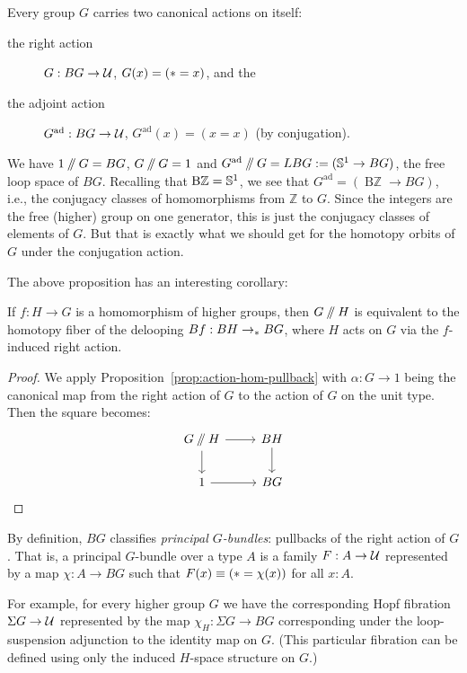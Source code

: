 Every group $G$ carries two canonical actions on itself:
\begin{description}
\item[the right action] $G : BG \to \mathcal{U}$, $G(x) = (\ast = x)$, and the
\item[the adjoint action] $G^{\mathrm{ad}} : BG \to \mathcal{U}$,
  $G^{\mathrm{ad}}(x) = (x = x)$ (by conjugation).
\end{description}

We have $1 \mathbin{/\kern-3pt/} G = BG$,
$G \mathbin{/\kern-3pt/} G = 1$ and $G^{\mathrm{ad}} \mathbin{/\kern-3pt/} G = LBG :=
({\mathbb{S}}^1 \to BG)$, the free loop space of $BG$. Recalling that $\mathop{\mathrm{B}\mathbb{Z}} =
{\mathbb{S}}^1$, we see that $G^{\mathrm{ad}} = (\mathop{\mathrm{B}\mathbb{Z}} \to BG)$, i.e., the
conjugacy classes of homomorphisms from $\mathbb{Z}$ to $G$. Since the
integers are the free (higher) group on one generator, this is just
the conjugacy classes of elements of $G$. But that is exactly what we
should get for the homotopy orbits of $G$ under the conjugation
action.

The above proposition has an interesting corollary:
\begin{cor}
  \label{cor:hfiber-hom}
  If $f : H \to G$ is a homomorphism of higher groups,
  then $G \mathbin{/\kern-3pt/} H$ is equivalent to the homotopy
  fiber of the delooping $Bf : BH \to_\ast BG$,
  where $H$ acts on $G$ via the $f$-induced right action.
\end{cor}
\begin{proof}
  We apply Proposition~\ref{prop:action-hom-pullback} with $\alpha : G \to 1$
  being the canonical map from the right action of $G$ to the action
  of $G$ on the unit type. Then the square becomes:
  \[
    \begin{tikzcd}[baseline=(O.base)]
      G \dblslash H \ar[r]\ar[d] & BH\ar[d] \\
      |[alias=O]| 1 \ar[r]       & BG
    \end{tikzcd}\qedhere
  \]
\end{proof}

By definition, $BG$ classifies \emph{principal $G$-bundles}: pullbacks
of the right action of $G$. That is, a principal $G$-bundle over a
type $A$ is a family $F : A \to \mathcal{U}$ represented by a map $\chi:A
\to BG$ such that $F(x) \equiv (\ast = \chi(x))$ for all $x : A$.

For example, for every higher group $G$ we have the corresponding Hopf
fibration $\Sigma G \to \mathcal{U}$ represented by the map $\chi_H : \Sigma
G \to BG$ corresponding under the loop-suspension adjunction to the
identity map on $G$. (This particular fibration can be defined using
only the induced $H$-space structure on $G$.)

